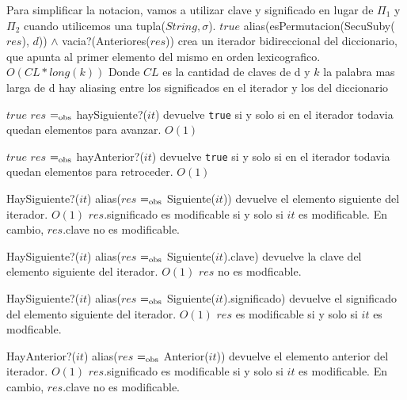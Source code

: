   Para simplificar la notacion, vamos a utilizar clave y significado en lugar de $\Pi_1$ y $\Pi_2$ cuando utilicemos una tupla($String,\sigma$).
 {$true$}
 {alias(esPermutacion(SecuSuby($res$), $d$)) $\land$ vacia?(Anteriores($res$))}
 {crea un iterador bidireccional del diccionario, que apunta al primer elemento del mismo en orden lexicografico.}
  {$O(CL*long(k))$ Donde $CL$ es la cantidad de claves de d y $k$ la palabra mas larga de d}
  {hay aliasing entre los significados en el iterador y los del diccionario}


	{$true$}  
  {$res$ $=_{\mathrm{obs}}$ haySiguiente?($it$)}
  {devuelve \texttt{true} si y solo si en el iterador todavia quedan elementos para avanzar.}
  {$O(1)$}
  {}

	{$true$}    
  {$res$ $=_{\mathrm{obs}}$ hayAnterior?($it$)}
  {devuelve \texttt{true} si y solo si en el iterador todavia quedan elementos para retroceder.}
  {$O(1)$}
  {}

  {HaySiguiente?($it$)}
  {alias($res$ $=_{\mathrm{obs}}$ Siguiente($it$))}
  {devuelve el elemento siguiente del iterador.}
  {$O(1)$}
  {$res$.significado es modificable si y solo si $it$ es modificable.  En cambio, $res$.clave no es modificable.}
  
  {HaySiguiente?($it$)}
  {alias($res$ $=_{\mathrm{obs}}$ Siguiente($it$).clave)}
  {devuelve la clave del elemento siguiente del iterador.}
  {$O(1)$}
  {$res$ no es modficable.}

  {HaySiguiente?($it$)}
  {alias($res$ $=_{\mathrm{obs}}$ Siguiente($it$).significado)}
  {devuelve el significado del elemento siguiente del iterador.}
  {$O(1)$}
  {$res$ es modificable si y solo si $it$ es modficable.}

  {HayAnterior?($it$)}
  {alias($res$ $=_{\mathrm{obs}}$ Anterior($it$))}
  {devuelve el elemento anterior del iterador.}
  {$O(1)$}
  {$res$.significado es modificable si y solo si $it$ es modificable.  En cambio, $res$.clave no es modificable.}

